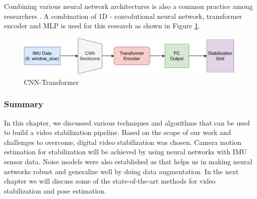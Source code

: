 Combining various neural network architectures is also a common practice among researchers \citep{deep_opti_stab} \citep{rao2022ctin}. A combination of 1D - convolutional neural network, transformer encoder and MLP is used for this research as shown in Figure \ref{fig:transformer_cnn}.

\begin{figure}[H]
    \centering
    \includegraphics[scale=0.7]{images/fig_chapter2/nns/transformer_cnn.pdf}
    \caption{CNN-Transformer}
    \label{fig:transformer_cnn}
\end{figure}

\subsubsection{Summary}
In this chapter, we discussed various techniques and algorithms that can be used to build a video stabilization pipeline. Based on the scope of our work and challenges to overcome, digital video stabilization was chosen. Camera motion estimation for stabilization will be achieved by using neural networks with IMU sensor data. Noise models were also established as that helps us in making neural networks robust and generalize well by doing data augmentation. In the next chapter we will discuss some of the state-of-the-art methods for video stabilization and pose estimation.


